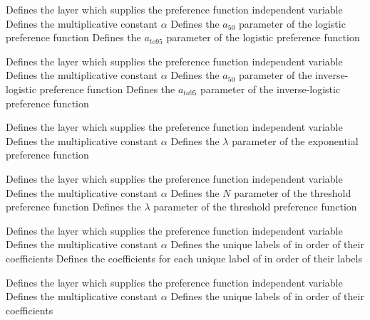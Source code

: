  {Defines the layer which supplies the preference function independent variable}
 {Defines the multiplicative constant $\alpha$}
 {Defines the $a_{50}$ parameter of the logistic preference function}
 {Defines the $a_{to95}$ parameter of the logistic preference function}
\par\textbf{}\par
{} {Defines the layer which supplies the preference function independent variable}
 {Defines the multiplicative constant $\alpha$}
 {Defines the $a_{50}$ parameter of the inverse-logistic preference function}
 {Defines the $a_{to95}$ parameter of the inverse-logistic preference function}
\par\textbf{}\par
{} {Defines the layer which supplies the preference function independent variable}
 {Defines the multiplicative constant $\alpha$}
 {Defines the $\lambda$ parameter of the exponential preference function}
\par\textbf{}\par
{} {Defines the layer which supplies the preference function independent variable}
 {Defines the multiplicative constant $\alpha$}
 {Defines the $N$ parameter of the threshold preference function}
 {Defines the $\lambda$ parameter of the threshold preference function}
\par\textbf{}\par
{} {Defines the layer which supplies the preference function independent variable}
 {Defines the multiplicative constant $\alpha$}
 {Defines the unique labels of  in order of their coefficients}
 {Defines the coefficients for each unique label of  in order of their labels}
\par\textbf{}\par
{} {Defines the layer which supplies the preference function independent variable}
 {Defines the multiplicative constant $\alpha$}
 {Defines the unique labels of  in order of their coefficients}
